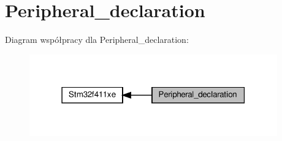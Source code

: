 \hypertarget{group___peripheral__declaration}{}\section{Peripheral\+\_\+declaration}
\label{group___peripheral__declaration}
Diagram współpracy dla Peripheral\+\_\+declaration\+:\nopagebreak
\begin{figure}[H]
\begin{center}
\leavevmode
\includegraphics[width=303pt]{group___peripheral__declaration}
\end{center}
\end{figure}
